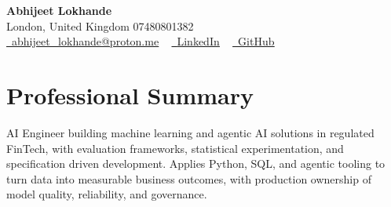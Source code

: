 \documentclass[a4paper,10pt]{article}
\begin{document}
    \begin{center}
        {\Huge\bfseries Abhijeet Lokhande}
        \\[2pt] {\color{muted}London, United Kingdom \textbar{} 07480801382}\\
        \small
        \href{mailto:abhijeet_lokhande@proton.me}{\raisebox{-0.2\height}{\color{primary}\faEnvelope}\  \underline{abhijeet\_lokhande@proton.me}} ~
        \href{https://www.linkedin.com/in/ablds/}{\raisebox{-0.2\height}{\color{primary}\faLinkedin}\ \underline{LinkedIn}}  ~
        \href{https://github.com/abhijeetscode}{\raisebox{-0.2\height}{\color{primary}\faGithub}\ \underline{GitHub}}
    \end{center}

\section{Professional Summary}
\vspace{-5pt}
{\color{muted}AI Engineer building machine learning and agentic AI solutions in regulated FinTech, with evaluation frameworks, statistical experimentation, and specification driven development. Applies Python, SQL, and agentic tooling to turn data into measurable business outcomes, with production ownership of model quality, reliability, and governance.}
\vspace{2pt}

\end{document}
